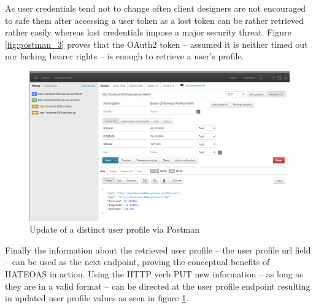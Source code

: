 \documentclass[BachelorPaper]{subfiles}
\begin{document}
As user credentials tend not to change often client designers are not encouraged to safe them after accessing a user token as a lost token can be rather retrieved rather easily whereas lost credentials impose a major security threat. Figure \ref{fig:postman_3} proves that the OAuth2 token -- assumed it is neither timed out nor lacking bearer rights -- is enough to retrieve a user's profile. \\

\begin{figure}[!htbp]
\centering
\includegraphics[width=0.96\linewidth]{PICs/BacPics/results/postman_4.png}
\caption{Update of a distinct user profile via Postman}\label{fig:postman_4}
\end{figure}

Finally the information about the retrieved user profile -- the user profile url field -- can be used as the next endpoint, proving the conceptual benefits of \ac{HATEOAS} in action. Using the \ac{HTTP} verb PUT new information -- as long as they are in a valid format -- can be directed at the user profile endpoint resulting in updated user profile values as seen in figure \ref{fig:postman_4}.
\end{document}

